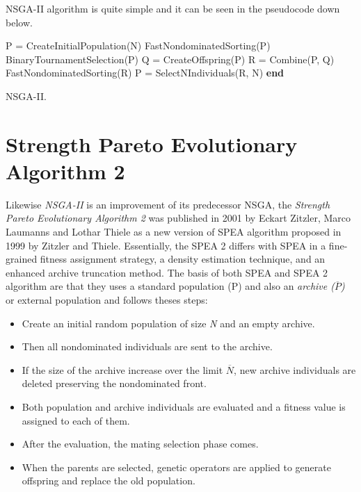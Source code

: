 NSGA-II algorithm is quite simple and it can be seen in the pseudocode down below.

\begin{algorithm}[H]
\begin{algorithmic}[1]
\State P = CreateInitialPopulation(N)\;
\State  FastNondominatedSorting(P)\;
    \State BinaryTournamentSelection(P)\;
    \State Q = CreateOffspring(P)\;
    \State R = Combine(P, Q)\;
    \State FastNondominatedSorting(R)\;
    \State P = SelectNIndividuals(R, N)\;
  \EndWhile
  \State \textbf{end}
\end{algorithmic}
\caption{NSGA-II.}
\end{algorithm}

\section{Strength Pareto Evolutionary Algorithm 2}
Likewise \textit{NSGA-II} is an improvement of its predecessor NSGA, the \textit{Strength Pareto Evolutionary Algorithm 2} was published in 2001 by Eckart Zitzler, Marco Laumanns and Lothar Thiele as a new version of SPEA algorithm proposed in 1999 by Zitzler and Thiele\cite{SPEA2}. Essentially, the SPEA 2 differs with SPEA in a fine-grained fitness assignment strategy, a density estimation technique, and an enhanced archive truncation method\cite{SPEA2}.
The basis of both SPEA and SPEA 2 algorithm are that they uses a standard population (P) and also an \textit{archive ($\overline{P}$)} or external population and follows theses steps:
\begin{itemize}
    \item Create an initial random population of size \textit{N} and an empty archive.
    \item Then all nondominated individuals are sent to the archive.
    \item If the size of the archive increase over the limit $\overline{N}$, new archive individuals are deleted preserving the nondominated front.
    \item Both population and archive individuals are evaluated and a fitness value is assigned to each of them.
    \item After the evaluation, the mating selection phase comes.
    \item When the parents are selected, genetic operators are applied to generate offspring and replace the old population.
\end{itemize}

